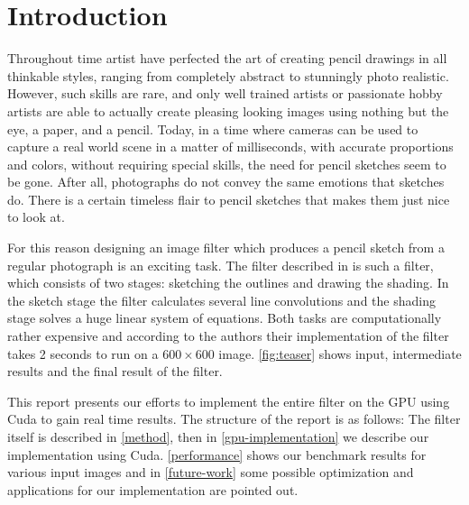 \section{Introduction}
Throughout time artist have perfected the art of creating pencil drawings in all
thinkable styles, ranging from completely abstract to stunningly photo realistic.
However, such skills are rare, and only well trained artists or passionate hobby
artists are able to actually create pleasing looking images using nothing but
the eye, a paper, and a pencil. Today, in a time where cameras can be used to
capture a real world scene in a matter of milliseconds, with accurate proportions and
colors, without requiring special skills, the need for pencil sketches seem to be gone.
After all, photographs do not convey the same emotions that sketches do. There is a certain
timeless flair to pencil sketches that makes them just nice to look at.

For this reason designing an image filter which produces a pencil sketch from
a regular photograph is an exciting task. The filter described in
\cite{mainPaper} is such a filter, which consists of two stages: sketching the
outlines and drawing the shading. In the sketch stage the filter calculates several
line convolutions and the shading stage solves a huge linear system of
equations. Both tasks are computationally rather expensive and according to the
authors their implementation of the filter takes 2 seconds to run on a
$600\times 600$ image. \autoref{fig:teaser} shows input, intermediate
results and the final result of the filter.

This report presents our efforts to implement the entire filter on the GPU using
Cuda to gain real time results. The structure of the report is as follows: The
filter itself is described in \autoref{method}, then in
\autoref{gpu-implementation} we describe our implementation using Cuda.
\autoref{performance} shows our benchmark results for various input images
and in \autoref{future-work} some possible optimization and applications for our
implementation are pointed out.
